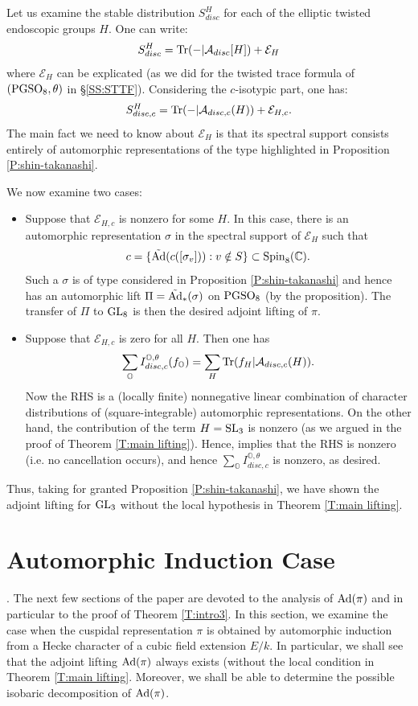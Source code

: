 \documentclass[11pt]{amsart}
\theoremstyle{plain}
\numberwithin{equation}{section}
\newcommand{\C}{\mathbb C}
\def\SL{{\rm SL}}
\def\PGSO{{\rm PGSO}}
\def\Spin{{\rm Spin}}
\def\Spin{{\rm Spin}}
\def\GL{{\rm GL}}
\def\C{{\bf C}}
\def\C{{\mathbb C}}
\begin{document}
Let us examine the stable distribution $S^H_{disc}$  for each of the elliptic twisted endoscopic groups $H$. One can write:
\[  S_{disc}^H   = {\rm Tr}( - | \mathcal{A}_{disc}[H]) + \mathcal{E}_H \]
where $ \mathcal{E}_H$ can be explicated (as we did for the twisted trace formula of $(\PGSO_8,\theta)$ in \S \ref{SS:STTF}). 
 Considering  the $c$-isotypic part, one has: 
 \[  S_{disc,c}^H   = {\rm Tr}( - | \mathcal{A}_{disc,c}(H)) + \mathcal{E}_{H,c}. \]
The main fact we need to know about $\mathcal{E}_H$ is that its spectral support consists entirely of automorphic representations of the type highlighted in Proposition \ref{P:shin-takanashi}. 
 \vskip 10pt
 
 We now examine two cases:
 \vskip 5pt
 
 \begin{itemize}
 \item Suppose that $\mathcal{E}_{H,c}$ is nonzero for some $H$. In this case, there is an automorphic representation $\sigma$ in the spectral support of $\mathcal{E}_H$ such that
 \[  c = \{   \tilde{\rm Ad} ( c([\sigma_v])): v \notin S \}  \subset \Spin_8(\C). \]
 Such a $\sigma$ is of type considered in Proposition \ref{P:shin-takanashi} and hence has an automorphic lift $\Pi =\tilde{\rm Ad}_*(\sigma)$ on   $\PGSO_8$ (by the proposition). The transfer of $\Pi$ to  $\GL_8$ is then the desired adjoint lifting of $\pi$.
 \vskip 5pt
 
 \item Suppose that $\mathcal{E}_{H,c}$ is zero for all $H$. Then one has
 \[   \sum_{\mathbb{O}} I^{\mathbb{O}, \theta}_{disc,c} (f_{\mathbb{O}}) = \sum_H    {\rm Tr}( f_H | \mathcal{A}_{disc,c}(H)). \]
Now the RHS  is a (locally finite) nonnegative linear combination of  character distributions of (square-integrable) automorphic representations.
 On the other hand,  the contribution of the term $H = \SL_3$ is nonzero (as we argued in the proof of Theorem \ref{T:main lifting}). 
 Hence, \cite[Prop. 3.5.1]{A} implies  that the RHS is nonzero (i.e. no cancellation occurs), and hence $ \sum_{\mathbb{O}} I^{\mathbb{O}, \theta}_{disc,c}$ is nonzero, as desired. 
 \end{itemize}
\vskip 5pt
Thus, taking for granted Proposition \ref{P:shin-takanashi}, we have shown the adjoint lifting for $\GL_3$  without the local hypothesis in Theorem \ref{T:main lifting}. 

 

\section{\bf Automorphic Induction Case}. \label{S:AI}
The next few sections of the paper are devoted to the analysis of ${\rm Ad}(\pi)$ and in particular to the proof of Theorem \ref{T:intro3}.
In this section, we examine the case when the cuspidal representation $\pi$ is obtained by automorphic induction from a Hecke character of a cubic field extension $E/k$. In particular, we shall see that the adjoint lifting ${\rm Ad}(\pi)$ always exists (without the local condition in Theorem \ref{T:main lifting}. Moreover, we shall be able to determine the possible isobaric decomposition of ${\rm Ad}(\pi)$.
\vskip 5pt
\end{document}
